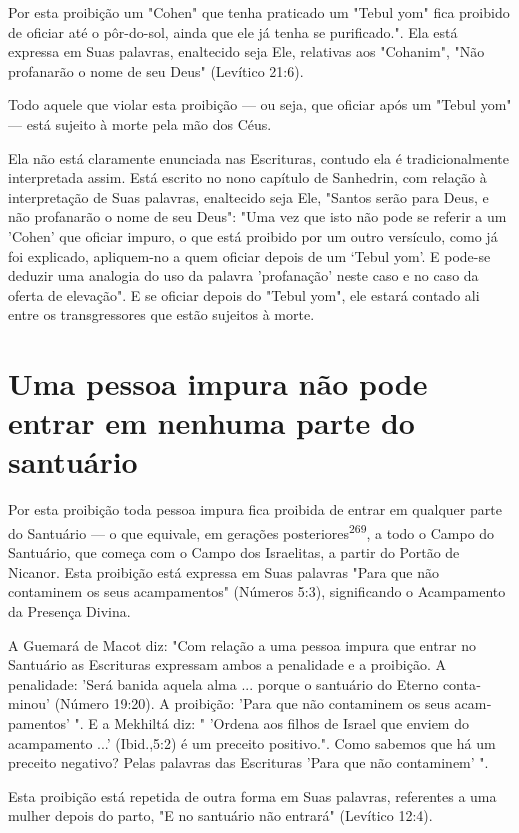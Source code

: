 \begin{itemize}
\begin{enumrate}
\begin{itemize}
\begin{itemize}
\begin{itemize}
Por esta proibição um "Cohen" que tenha praticado um "Tebul yom" fica
proibido de oficiar até o pôr-do-sol, ainda que ele já tenha se
purificado.". Ela está expressa em Suas palavras,
enaltecido seja Ele, relativas aos "Cohanim", "Não profanarão o nome de
seu Deus" (Levítico 21:6).

Todo aquele que violar esta proibição --- ou seja, que oficiar após um
"Tebul yom" --- está sujeito à morte pela mão dos Céus.

Ela não está claramente enunciada nas Escrituras, contudo ela é
tra­dicionalmente interpretada assim. Está escrito no nono capítulo de
Sanhedrin, com relação à interpretação de Suas palavras, enaltecido seja
Ele, "Santos serão
para Deus, e não profanarão o nome de seu Deus": "Uma vez que isto não
po­de se referir a um 'Cohen' que oficiar impuro, o que está proibido
por um ou­tro versículo, como já foi explicado, apliquem-no a quem
oficiar depois de um `Tebul yom'. E pode-se deduzir uma analogia do uso
da palavra 'profanação' neste caso e no caso da oferta de elevação". E
se oficiar depois do "Tebul yom", ele estará contado ali entre os
transgressores que estão sujeitos à morte.


\section{Uma pessoa impura não pode entrar em nenhuma parte do santuário}


Por esta proibição toda pessoa impura fica proibida de entrar em
qual­quer parte do Santuário --- o que equivale, em gerações
posteriores\textsuperscript{269}, a todo o Campo do Santuário, que
começa com o Campo dos Israelitas, a partir do Portão de Nicanor. Esta
proibição está expressa em Suas palavras "Para que não contaminem os
seus acampamentos" (Números 5:3), significando o Acampa­mento da
Presença Divina.

A Guemará de Macot diz: "Com relação a uma pessoa impura que entrar no
Santuário as Escrituras expressam ambos a penalidade e a proibição. A
penalidade: 'Será banida aquela alma ... porque o santuário do Eterno
conta­minou' (Número 19:20). A proibição: 'Para que não contaminem os
seus acam­pamentos' ". E a Mekhiltá diz: " 'Ordena aos filhos de Israel
que enviem do acampamento ...' (Ibid.,5:2) é um preceito
positivo.". Como sabemos que há um preceito negativo?
Pelas palavras das Escrituras 'Para que não contaminem' ".

Esta proibição está repetida de outra forma em Suas palavras,
refe­rentes a uma mulher depois do parto, "E no santuário não entrará"
(Levítico 12:4).


\end{itemize}
\end{itemize}
\end{itemize}
\end{enumrate}
\end{itemize}
